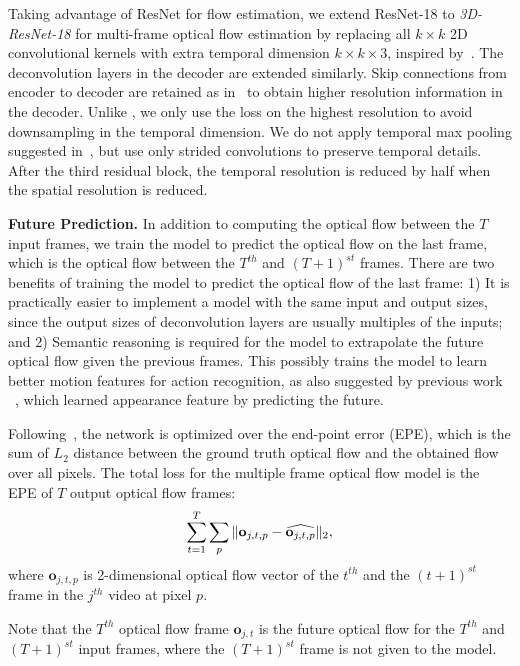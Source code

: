 \documentclass[10pt,twocolumn,letterpaper]{article}
\begin{document}
Taking advantage of ResNet for flow estimation, we extend ResNet-18 to \emph{3D-ResNet-18} for multi-frame optical flow estimation by replacing all $k\times k$ 2D convolutional kernels with extra temporal dimension $k \times k \times 3$, inspired by~\cite{tranbftp16}.
The deconvolution layers in the decoder are extended similarly.
Skip connections from encoder to decoder are retained as in~\cite{FischerDIHHGSCB15} to obtain higher resolution information in the decoder.
Unlike \cite{FischerDIHHGSCB15}, we only use the loss on the highest resolution to avoid downsampling in the temporal dimension. We do not apply temporal max pooling suggested in~\cite{tranBFTP15,tranbftp16}, but use only strided convolutions to preserve temporal details. After the third residual block, the temporal resolution is reduced by half when the spatial resolution is reduced.

\textbf{Future Prediction.}
In addition to computing the optical flow between the $T$ input frames, we train the model to predict the optical flow on the last frame, which is the optical flow between the $T^{th}$ and $(T+1)^{st}$ frames.
There are two benefits of training the model to predict the optical flow of the last frame:
1) It is practically easier to implement a model with the same input and output sizes, since the output sizes of deconvolution layers are usually multiples of the inputs; and
2) Semantic reasoning is required for the model to extrapolate the future optical flow given the previous frames. This possibly trains the model to learn better motion features for action recognition, as also suggested by previous work ~\cite{walker2016uncertain}, which learned appearance feature by predicting the future.

Following~\cite{FischerDIHHGSCB15}, the network is optimized over the end-point error (EPE), which is the sum of $L_2$ distance between the ground truth optical flow and the obtained flow over all pixels.
The total loss for the multiple frame optical flow model is the EPE of $T$ output optical flow frames:
\vspace{-.5em}\begin{equation}
  \sum_{t=1}^T\sum_{p} \|\mathbf{o}_{j,t,p} - \widehat{\mathbf{o}_{j,t,p}} \|_2,
	\label{eq:loss_epe}
  \vspace{-.5em}
\end{equation}
where $\mathbf{o}_{j,t,p}$ is 2-dimensional optical flow vector of the $t^{th}$ and the $(t+1)^{st}$ frame in the $j^{th}$ video at pixel $p$.

Note that the $T^{th}$ optical flow frame $\mathbf{o}_{j,t}$ is the future optical flow for the $T^{th}$ and $(T+1)^{st}$ input frames, where the $(T+1)^{st}$ frame is not given to the model.
\end{document}
